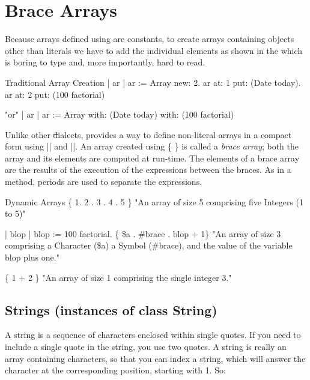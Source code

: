 \documentclass[a4paper,10pt,twoside]{book}
\begin{document}
\section{Brace Arrays}
\label{sec:brace}
Because arrays defined using \ct{#()} are constants, 
to create arrays containing objects other than literals we have to add the individual elements as shown in the  which is boring to type and, more importantly, hard to read. 

\begin{script}{Traditional Array Creation}\label{eg:boring}
| ar | 
ar := Array new: 2. 
ar at: 1 put: (Date today).
ar at: 2 put: (100 factorial)

"or"
| ar | 
ar := Array with: (Date today) with: (100 factorial)
\end{script}

Unlike other \st dialects, \sq  provides a way to define non-literal arrays in a compact form using \index{\{\}} \ct|{| and \ct|}|. An array created using \{ \} is called a  \textit{brace array}; both the array and its elements are computed at run-time. The elements of a brace array are the results of the execution of the expressions between the braces.
As in a method, periods are used to separate the expressions. 

\begin{script}{Dynamic Arrays}
\{ 1. 2 . 3 . 4 . 5 \} 
"An array of size 5 comprising five Integers (1 to 5)"

| blop |
blop := 100 factorial. 
\{ \$a . #brace . blop + 1\} 
"An array of size 3 comprising a Character (\$a) a Symbol (#brace),
 and the value of the variable blop plus one."

\{ 1 + 2 \} "An array of size 1 comprising the single integer 3."
\end{script}


\subsection{Strings (instances of class String)}
A  string is a sequence of characters enclosed within  single quotes. 
If you need to include a single quote in the string, you use two quotes.
A string is really an array containing characters, so that you can index a string, which will answer the character at the corresponding position, starting with 1. 
So:
\end{document}

